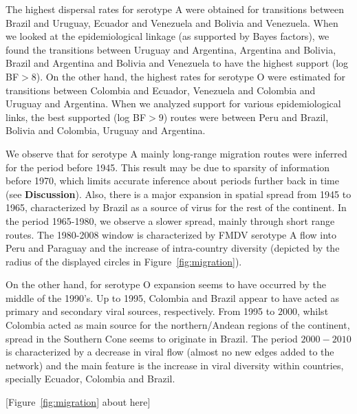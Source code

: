 \documentclass[10pt]{article}
\begin{document}
The highest dispersal rates for serotype A were obtained for transitions between Brazil and Uruguay, Ecuador and Venezuela and Bolivia and Venezuela.
When we looked at the epidemiological linkage (as supported by Bayes factors), we found the transitions between Uruguay and Argentina, Argentina and Bolivia, Brazil and Argentina and Bolivia and Venezuela to have the highest support (log BF$>8$).
On the other hand, the highest rates for serotype O were estimated for transitions between Colombia and Ecuador, Venezuela and Colombia and Uruguay and Argentina.
When we analyzed support for various epidemiological links, the best supported (log BF$>9$) routes were between Peru and Brazil, Bolivia and Colombia, Uruguay and Argentina.

We observe that for serotype A mainly long-range migration routes were inferred for the period before 1945.
This result may be due to sparsity of information before 1970, which limits accurate inference about periods further back in time (see {\bf Discussion}). 
Also, there is a major expansion in spatial spread from 1945 to 1965, characterized by Brazil as a source of virus for the rest of the continent.
In the period 1965-1980, we observe a slower spread, mainly through short range routes.
The 1980-2008 window is characterized by FMDV serotype A flow into Peru and Paraguay and the increase of intra-country diversity (depicted by the radius of the displayed circles in Figure~\ref{fig:migration}).   

On the other hand, for serotype O expansion seems to have occurred by the middle of the 1990's.
Up to 1995, Colombia and Brazil appear to have acted as primary and secondary viral sources, respectively.
From 1995 to $2000$, whilst Colombia acted as main source for the northern/Andean regions of the continent, spread in the Southern Cone seems to originate in Brazil.
The period $2000-2010$ is characterized by a decrease in viral flow (almost no new edges added to the network) and the main feature is the increase in viral diversity within countries, specially Ecuador, Colombia and Brazil.

\begin{center}
 [Figure~\ref{fig:migration} about here]
\end{center}
\end{document}
